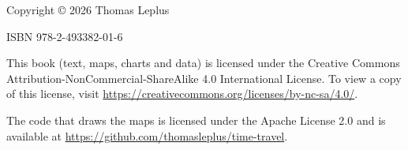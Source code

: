 \thispagestyle{empty}
\vspace*{\fill}
\begin{flushleft}
\small
Copyright \copyright{} 2026 Thomas Leplus

\medskip
ISBN 978-2-493382-01-6 %

\medskip
This book (text, maps, charts and data) is licensed under the Creative Commons
Attribution-NonCommercial-ShareAlike 4.0 International License. To view a copy of this
license, visit \url{https://creativecommons.org/licenses/by-nc-sa/4.0/}.

\medskip
The code that draws the maps is licensed under the Apache License 2.0 and is available at
\url{https://github.com/thomasleplus/time-travel}.
\ifdefined\bookrevision%
  \par\medskip
  \bookrevision{}%
\fi
\end{flushleft}
\clearpage
